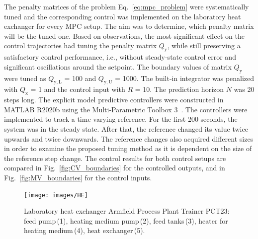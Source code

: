 \documentclass[preprint,12pt]{elsarticle}
\begin{document}
The penalty matrices of the problem Eq.~\eqref{eq:mpc_problem} were systematically tuned and the corresponding control was implemented on the laboratory heat exchanger for every MPC setup. The aim was to determine, which penalty matrix will be the tuned one. Based on observations, the most significant effect on the control trajectories had tuning the penalty matrix $Q_\mathrm{y}$, while still preserving a satisfactory control performance, i.e., without steady-state control error and significant oscillations around the setpoint. The boundary values of matrix $Q_\mathrm{y}$ were tuned as $Q_\mathrm{y, L}$ = 100 and $Q_\mathrm{y, U}$ = 1000. The built-in integrator was penalized with $Q_\mathrm{x}$ = 1 and the control input with $R$ = 10. The prediction horizon $N$ was 20 steps long. The explicit model predictive controllers were constructed in MATLAB R2020b using the Multi-Parametric Toolbox 3~\cite{mpt_conf}. 
The controllers were implemented to track a time-varying reference. For the first 200 seconds, the system was in the steady state. After that, the reference changed its value twice upwards and twice downwards. The reference changes also acquired different sizes in order to examine the proposed tuning method as it is dependent on the size of the reference step change. The control results for both control setups are compared in Fig.~\ref{fig:CV_boundaries} for the controlled outputs, and in Fig.~\ref{fig:MV_boundaries} for the control inputs.
    

\begin{figure}
	\begin{center}
		\texttt{[image: images/HE]}
		\caption[Heat exchanger Armfield Process Plant Trainer PCT23]{Laboratory heat exchanger Armfield Process Plant Trainer PCT23: feed pump\,(1), heating medium pump\,(2), feed tanks\,(3), heater for heating medium\,(4), heat exchanger\,(5).}
		\label{fig:HE}
	\end{center}
\end{figure}
\end{document}
